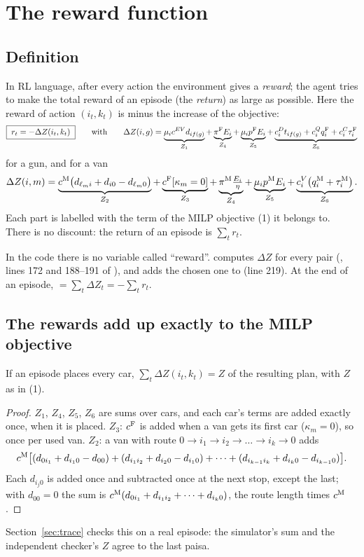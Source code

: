 \section{The reward function}
\label{sec:reward}

\subsection{Definition}

In RL language, after every action the environment gives a \emph{reward}; the agent tries to make the total reward of an episode (the \emph{return}) as large as possible. Here the reward of action $(i_t,k_t)$ is minus the increase of the objective:
\[
\boxed{\;r_t=-\Delta Z(i_t,k_t)\;}
\qquad\text{with}\qquad
\Delta Z(i,g)=\underbrace{\mu_ic^{EV}d_{if(g)}}_{Z_1}+\underbrace{\pi^{\mathrm{F}} E_i}_{Z_4}+\underbrace{\mu_ip^{\mathrm{F}} E_i}_{Z_5}+\underbrace{c^D_it_{if(g)}+c^Q_iq^{\mathrm{F}}_i+c^C_i\tau^{\mathrm{F}}_i}_{Z_6}
\]
for a gun, and for a van
\[
\Delta Z(i,m)=\underbrace{c^{\mathrm{M}}\big(d_{\ell_mi}+d_{i0}-d_{\ell_m0}\big)}_{Z_2}+\underbrace{c^{\mathrm{F}}[\kappa_m=0]}_{Z_3}+\underbrace{\pi^{\mathrm{M}}\tfrac{E_i}{\eta}}_{Z_4}+\underbrace{\mu_ip^{\mathrm{M}} E_i}_{Z_5}+\underbrace{c^V_i\big(q^{\mathrm{M}}_i+\tau^{\mathrm{M}}_i\big)}_{Z_6}.
\]
Each part is labelled with the term of the MILP objective (1) it belongs to. There is no discount: the return of an episode is $\sum_tr_t$.

In the code there is no variable called ``reward''.  computes $\Delta Z$ for every pair (, lines 172 and 188--191 of ), and  adds the chosen one to  (line 219). At the end of an episode,  $=\sum_t\Delta Z_t=-\sum_tr_t$.

\subsection{The rewards add up exactly to the MILP objective}

\begin{proposition}\label{prop:sum}
If an episode places every car, $\sum_t\Delta Z(i_t,k_t)=Z$ of the resulting plan, with $Z$ as in (1).
\end{proposition}
\begin{proof}
$Z_1$, $Z_4$, $Z_5$, $Z_6$ are sums over cars, and each car's terms are added exactly once, when it is placed. $Z_3$: $c^{\mathrm{F}}$ is added when a van gets its first car ($\kappa_m=0$), so once per used van. $Z_2$: a van with route $0\to i_1\to i_2\to\dots\to i_k\to0$ adds
\[
c^{\mathrm{M}}\big[(d_{0i_1}+d_{i_10}-d_{00})+(d_{i_1i_2}+d_{i_20}-d_{i_10})+\dots+(d_{i_{k-1}i_k}+d_{i_k0}-d_{i_{k-1}0})\big].
\]
Each $d_{i_j0}$ is added once and subtracted once at the next stop, except the last; with $d_{00}=0$ the sum is $c^{\mathrm{M}}(d_{0i_1}+d_{i_1i_2}+\dots+d_{i_k0})$, the route length times $c^{\mathrm{M}}$.
\end{proof}
Section~\ref{sec:trace} checks this on a real episode: the simulator's sum and the independent checker's $Z$ agree to the last paisa.

